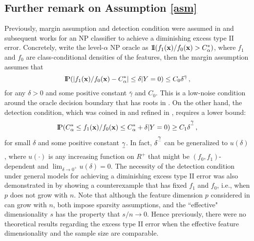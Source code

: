 \documentclass[12pt]{article}
\numberwithin{equation}{section}
\theoremstyle{remark}
\newcommand{\p}{{\rm I}\kern-0.18em{\rm P}}
\newcommand{\1}{{\rm 1}\kern-0.24em{\rm I}}
\newcommand{\uderbar}[1]{\underset{\raise0.3em\hbox{$\smash{\scriptscriptstyle-}$}}{#1}}
\begin{document}
\appendix
\begin{appendices}

\section{Further remark on Assumption \ref{asm} } \label{rem:assump}
Previously, margin assumption and detection condition were assumed in \cite{tong2013plug} and subsequent works \cite{zhao2016neyman, Tong.Xia.Wang.Feng.2020} for an NP classifier to achieve a diminishing excess type II error. Concretely, write the level-$\alpha$ NP oracle as $\1(f_1({\bf x})/f_0({\bf x})> C^*_{\alpha})$, where $f_1$ and $f_0$ are class-conditional densities of the features,  then the margin assumption assumes that 
 \begin{align*}
  \p (|f_1({\bf x})/f_0({\bf x})-C^*_{\alpha}|\leq \delta | Y=0)\leq C_0  \delta^{\bar\gamma}\,,
 \end{align*}
for any $\delta>0$ and some positive constant $\bar\gamma$ and $C_0$. This is a low-noise condition around the oracle decision boundary that has roots in \cite{Polonik.1995, Mammen.Tsybakov.1999}. On the other hand, the detection condition, which was coined in \cite{tong2013plug} and refined in \cite{zhao2016neyman}, requires a lower bound:
\begin{align*}
     \p(C^*_{\alpha}\leq f_1({\bf x})/f_0({\bf x})\leq C^*_{\alpha}+ \delta | Y=0) \geq C_1 \delta^{\uderbar{\gamma}}\,,
\end{align*}
for small $\delta$ and some positive constant $\uderbar{\gamma}$. In fact, $\delta^{\uderbar{\gamma}}$ can be generalized to $u(\delta)$, where $u(\cdot)$ is any increasing function on $R^+$ that might be $(f_0, f_1)$-dependent and $\lim_{\delta\to 0^+}u(\delta)= 0$. The necessity of the detection condition under general models for achieving a diminishing excess type II error was also demonstrated in \cite{zhao2016neyman} by showing a counterexample  that has fixed $f_1$ and $f_0$, i.e., when $p$ does not grow with $n$. Note that although the feature dimension $p$ considered in \cite{zhao2016neyman, Tong.Xia.Wang.Feng.2020} can grow with $n$, both impose sparsity assumptions, and the ``effective" dimensionality $s$ has the property that $s/n\to 0$. Hence previously, there were no theoretical results regarding the excess type II error when the effective feature dimensionality and the sample size are comparable. 


\end{appendices}
\end{document}
